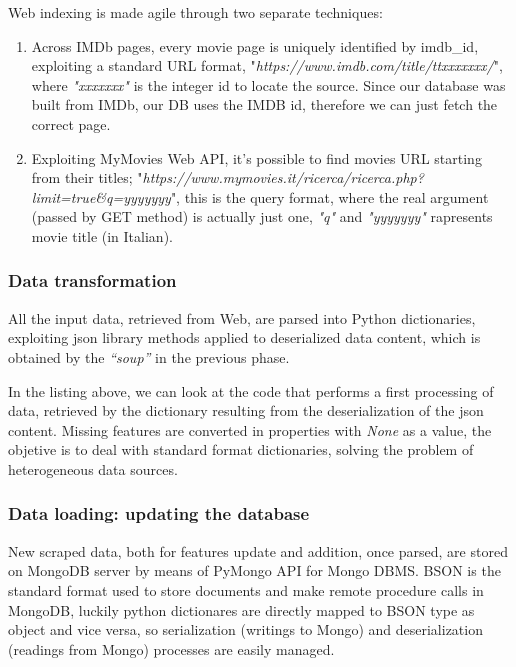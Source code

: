 \documentclass[11pt]{article}
\begin{document}
Web indexing is made agile through two separate techniques:

\begin{enumerate}
    \item Across IMDb pages, every movie page is uniquely identified by imdb\_id, exploiting a standard URL format, "\emph{https://www.imdb.com/title/ttxxxxxxx/}", where \emph{"xxxxxxx"} is the integer id to locate the source. Since our database was built from IMDb, our DB uses the IMDB id, therefore we can just fetch the correct page.
    \item Exploiting MyMovies Web API, it's possible to find movies URL starting from their titles; "\emph{https://www.mymovies.it/ricerca/ricerca.php?limit=true\&q=yyyyyyy}", this is the query format, where the real argument (passed by GET method) is actually just one, \emph{"q"} and \emph{"yyyyyyy"} rapresents movie title (in Italian).
\end{enumerate}
\subsubsection{Data transformation}
All the input data, retrieved from Web, are parsed into Python dictionaries, exploiting json library methods applied to deserialized data content, which is obtained by the \emph{``soup''} in the previous phase.


In the listing above, we can look at the code that performs a first processing of data, retrieved by the dictionary resulting from the deserialization of the json content. Missing features are converted in properties with \emph{None} as a value, the objetive is to deal with standard format dictionaries, solving the problem of heterogeneous data sources.

\subsubsection{Data loading: updating the database}
New scraped data, both for features update and addition, once parsed, are stored on MongoDB server by means of PyMongo API for Mongo DBMS. BSON is the standard format used to store documents and make remote procedure calls in MongoDB, luckily python dictionares are directly mapped to BSON type as object and vice versa, so serialization (writings to Mongo) and deserialization (readings from Mongo) processes are easily managed.
\end{document}
